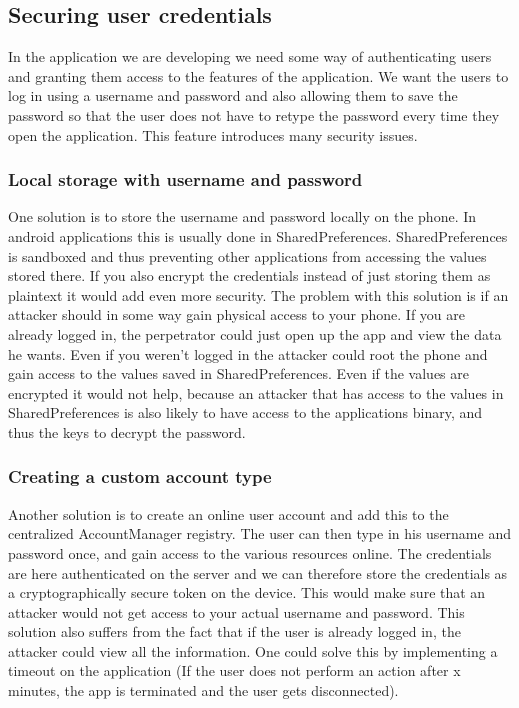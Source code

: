 \subsection{Securing user credentials}
In the application we are developing we need some way of authenticating users and granting them access to the features of the application. We want the users to log in using a username and password and also allowing them to save the password so that the user does not have to retype the password every time they open the application. This feature introduces many security issues. 

\subsubsection{Local storage with username and password}
One solution is to store the username and password locally on the phone. In android applications this is usually done in SharedPreferences. SharedPreferences is sandboxed and thus preventing other applications from accessing the values stored there. If you also encrypt the credentials instead of just storing them as plaintext it would add even more security. 
\newline
\newline
The problem with this solution is if an attacker should in some way gain physical access to your phone. If you are already logged in, the perpetrator could just open up the app and view the data he wants. Even if you weren’t logged in the attacker could root the phone and gain access to the values saved in SharedPreferences. Even if the values are encrypted it would not help, because an attacker that has access to the values in SharedPreferences is also likely to have access to the applications binary, and thus the keys to decrypt the password.

\subsubsection{Creating a custom account type}
Another solution is to create an online user account and add this to the centralized AccountManager registry. The user can then type in his username and password once, and gain access to the various resources online. The credentials are here authenticated on the server and we can therefore store the credentials as a cryptographically secure token on the device. This would make sure that an attacker would not get access to your actual username and password. 
\newline
\newline
This solution also suffers from the fact that if the user is already logged in, the attacker could view all the information. One could solve this by implementing a timeout on the application (If the user does not perform an action after x minutes, the app is terminated and the user gets disconnected).

